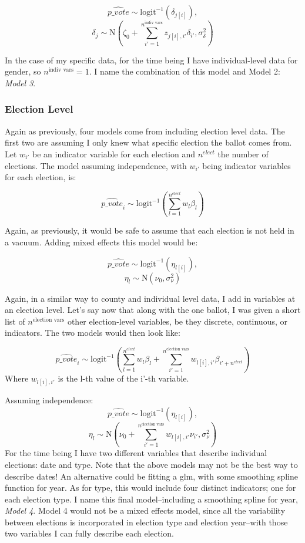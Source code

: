 \documentclass[12pt,twoside]{reedthesis}
\begin{document}
  \[\hat{p\_vote} \sim \text{logit}^{-1}(\delta_{j[i]}), \]
  \[\delta_{j} \sim \text{N}(\zeta_0 + \sum_{i'=1}^{n^{\text{indiv vars}}}z_{j[i], i'}\delta_{i'}, \sigma_{\delta}^2)\]
  
  In the case of my specific data, for the time being I have
  individual-level data for gender, so \(n^{\text{indiv vars}} = 1\). I
  name the combination of this model and Model 2: \emph{Model 3}.
  
  \subsubsection{Election Level}\label{election-level}
  
  Again as previously, four models come from including election level
  data. The first two are assuming I only knew what specific election the
  ballot comes from. Let \(w_{i'}\) be an indicator variable for each
  election and \(n^{elect}\) the number of elections. The model assuming
  independence, with \(w_{i'}\) being indicator variables for each
  election, is:
  
  \[\hat{p\_vote}_i \sim \text{logit}^{-1}(\sum_{l = 1}^{n^{elect}}w_{l}\beta_{l})\]
  
  Again, as previously, it would be safe to assume that each election is
  not held in a vacuum. Adding mixed effects this model would be:
  
  \[\hat{p\_vote} \sim \text{logit}^{-1}(\eta_{l[i]}), \]
  \[\eta_{l} \sim \text{N}(\nu_0, \sigma_{\nu}^2)\]
  
  Again, in a similar way to county and individual level data, I add in
  variables at an election level. Let's say now that along with the one
  ballot, I was given a short list of \(n^{\text{election vars}}\) other
  election-level variables, be they discrete, continuous, or indicators.
  The two models would then look like:
  
  \[\hat{p\_vote}_i \sim \text{logit}^{-1}(\sum_{l = 1}^{n^{elect}}w_{l}\beta_{l} + \sum_{i'=1}^{n^{\text{election vars}}}w_{l[i], i'}\beta_{i'+n^{elect}})\]
  Where \(w_{l[i], i'}\) is the l-th value of the i'-th variable.
  
  Assuming independence:
  \[\hat{p\_vote} \sim \text{logit}^{-1}(\eta_{l[i]}), \]
  \[\eta_{l} \sim \text{N}(\nu_0 + \sum_{i'=1}^{n^{\text{election vars}}}w_{l[i], i'}\nu_{i'}, \sigma_{\nu}^2)\]
  For the time being I have two different variables that describe
  individual elections: date and type. Note that the above models may not
  be the best way to describe dates! An alternative could be fitting a
  glm, with some smoothing spline function for year. As for type, this
  would include four distinct indicators; one for each election type. I
  name this final model--including a smoothing spline for year,
  \emph{Model 4}. Model 4 would not be a mixed effects model, since all
  the variability between elections is incorporated in election type and
  election year--with those two variables I can fully describe each
  election.
  
\end{document}
